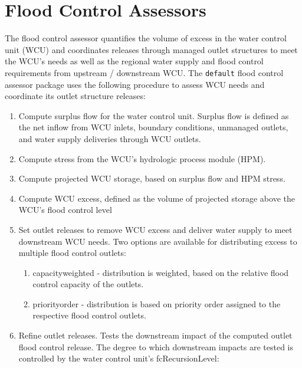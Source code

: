\section{Flood Control Assessors}\label{fcAssessor}

The flood control assessor quantifies the volume of excess in the
water control unit (WCU) and coordinates releases through managed
outlet structures to meet the WCU's needs as well as the regional
water supply and flood control requirements from upstream / downstream
WCU.  The {\tt default} flood control assessor package uses the
following procedure to assess WCU needs and coordinate its outlet
structure releases:

\begin{enumerate}
 \item Compute surplus flow for the water control unit.  Surplus flow
   is defined as the net inflow from WCU inlets, boundary conditions,
   unmanaged outlets, and water supply deliveries through WCU outlets.

 \item Compute stress from the WCU's hydrologic process module (HPM).

 \item Compute projected WCU storage, based on surplus flow and HPM
   stress.

 \item Compute WCU excess, defined as the volume of projected storage
   above the WCU's flood control level

 \item Set outlet releases to remove WCU excess and deliver water
   supply to meet downstream WCU needs.  Two options are available for
   distributing excess to multiple flood control outlets:

  \begin{enumerate}

    \item capacityweighted \-- distribution is weighted, based on the
      relative flood control capacity of the outlets.

    \item priorityorder \-- distribution is based on priority order
      assigned to the respective flood control outlets.

  \end{enumerate}

 \item Refine outlet releases.  Tests the downstream impact of the
   computed outlet flood control release. The degree to which
   downstream impacts are tested is controlled by the water control
   unit's fcRecursionLevel:


\end{enumerate}
